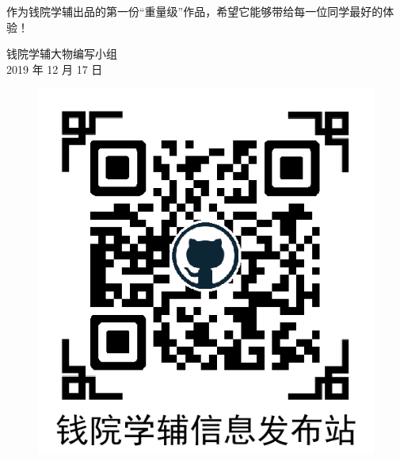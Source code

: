 作为钱院学辅出品的第一份“重量级”作品，希望它能够带给每一位同学最好的体验！

\begin{flushright}
	钱院学辅大物编写小组\\
	2019 年 12 月 17 日
\end{flushright}
\vspace{1.0cm}
\begin{figure}[!h]
	\centering
	\begin{minipage}[c]{0.4\textwidth}
		\centering
		\includegraphics[width=\linewidth]{./template/qrcode2.png}
	\end{minipage}%
	\begin{minipage}[c]{0.4\textwidth}
		\centering

\end{minipage}
\end{figure}
